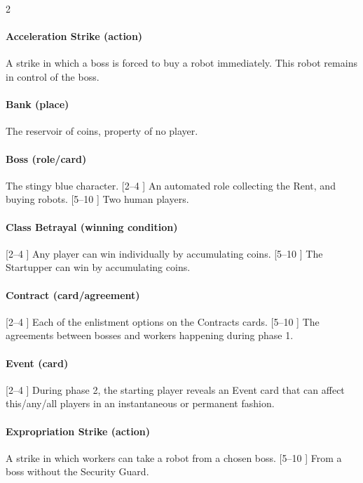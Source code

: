     \begin{multicols}{2}
    
        \paragraph{Acceleration Strike (action)}
            A strike in which a boss is forced to buy a robot
            immediately. This robot remains in control of the boss.
        
        \paragraph{Bank (place)}
            The reservoir of coins, property of no player.
        
        \paragraph{Boss (role/card)}
            The stingy blue character. [2–4 \faPeopleGroup] An automated role collecting
            the Rent, and buying robots. [5–10 \faPeopleGroup] Two human players.
        
        \paragraph{Class Betrayal (winning condition)}
            [2–4 \faPeopleGroup] Any player can win individually by
            accumulating coins. [5–10 \faPeopleGroup] The Startupper can win by accumulating coins.
        
        \paragraph{Contract (card/agreement)}
            [2–4 \faPeopleGroup] Each of the enlistment options on the Contracts
            cards. [5–10 \faPeopleGroup] The agreements between bosses and workers happening
            during phase 1.
        
        \paragraph{Event (card)}
            [2–4 \faPeopleGroup] During phase 2, the starting player reveals an Event card
            that can affect this/any/all players in an instantaneous or permanent fashion.
        
        \paragraph{Expropriation Strike (action)}
            A strike in which workers can take a robot from a
            chosen boss. [5–10 \faPeopleGroup] From a boss without the Security Guard.
        

\end{multicols}
